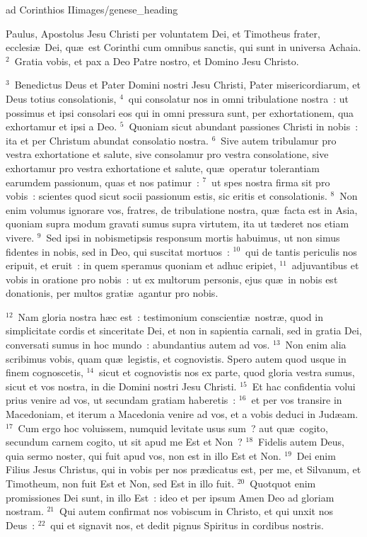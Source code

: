 {ad Corinthios II}{images/genese_heading}


\lettrine[lines=6,image=true,loversize=0.05,lraise=-0.03]{P}{}aulus, Apostolus Jesu Christi per voluntatem Dei, et Timotheus frater, ecclesi\ae\ Dei, qu\ae\ est Corinthi cum omnibus sanctis, qui sunt in universa Achaia.
${}^{2}$~Gratia vobis, et pax a Deo Patre nostro, et Domino Jesu Christo.


${}^{3}$~Benedictus Deus et Pater Domini nostri Jesu Christi, Pater misericordiarum, et Deus totius consolationis,
${}^{4}$~qui consolatur nos in omni tribulatione nostra~: ut possimus et ipsi consolari eos qui in omni pressura sunt, per exhortationem, qua exhortamur et ipsi a Deo.
${}^{5}$~Quoniam sicut abundant passiones Christi in nobis~: ita et per Christum abundat consolatio nostra.
${}^{6}$~Sive autem tribulamur pro vestra exhortatione et salute, sive consolamur pro vestra consolatione, sive exhortamur pro vestra exhortatione et salute, qu\ae\ operatur tolerantiam earumdem passionum, quas et nos patimur~:
${}^{7}$~ut spes nostra firma sit pro vobis~: scientes quod sicut socii passionum estis, sic eritis et consolationis.
${}^{8}$~Non enim volumus ignorare vos, fratres, de tribulatione nostra, qu\ae\ facta est in Asia, quoniam supra modum gravati sumus supra virtutem, ita ut t\ae deret nos etiam vivere.
${}^{9}$~Sed ipsi in nobismetipsis responsum mortis habuimus, ut non simus fidentes in nobis, sed in Deo, qui suscitat mortuos~:
${}^{10}$~qui de tantis periculis nos eripuit, et eruit~: in quem speramus quoniam et adhuc eripiet,
${}^{11}$~adjuvantibus et vobis in oratione pro nobis~: ut ex multorum personis, ejus qu\ae\ in nobis est donationis, per multos grati\ae\ agantur pro nobis.


${}^{12}$~Nam gloria nostra h\ae c est~: testimonium conscienti\ae\ nostr\ae , quod in simplicitate cordis et sinceritate Dei, et non in sapientia carnali, sed in gratia Dei, conversati sumus in hoc mundo~: abundantius autem ad vos.
${}^{13}$~Non enim alia scribimus vobis, quam qu\ae\ legistis, et cognovistis. Spero autem quod usque in finem cognoscetis,
${}^{14}$~sicut et cognovistis nos ex parte, quod gloria vestra sumus, sicut et vos nostra, in die Domini nostri Jesu Christi.
${}^{15}$~Et hac confidentia volui prius venire ad vos, ut secundam gratiam haberetis~:
${}^{16}$~et per vos transire in Macedoniam, et iterum a Macedonia venire ad vos, et a vobis deduci in Jud\ae am.
${}^{17}$~Cum ergo hoc voluissem, numquid levitate usus sum~? aut qu\ae\ cogito, secundum carnem cogito, ut sit apud me Est et Non~?
${}^{18}$~Fidelis autem Deus, quia sermo noster, qui fuit apud vos, non est in illo Est et Non.
${}^{19}$~Dei enim Filius Jesus Christus, qui in vobis per nos pr\ae dicatus est, per me, et Silvanum, et Timotheum, non fuit Est et Non, sed Est in illo fuit.
${}^{20}$~Quotquot enim promissiones Dei sunt, in illo Est~: ideo et per ipsum Amen Deo ad gloriam nostram.
${}^{21}$~Qui autem confirmat nos vobiscum in Christo, et qui unxit nos Deus~:
${}^{22}$~qui et signavit nos, et dedit pignus Spiritus in cordibus nostris.


